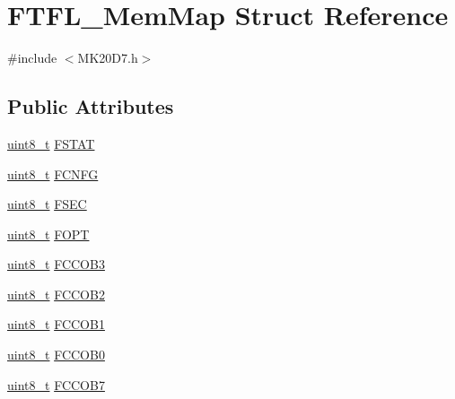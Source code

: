 \hypertarget{struct_f_t_f_l___mem_map}{}\section{F\+T\+F\+L\+\_\+\+Mem\+Map Struct Reference}
\label{struct_f_t_f_l___mem_map}


{\ttfamily \#include $<$M\+K20\+D7.\+h$>$}

\subsection*{Public Attributes}
\begin{DoxyCompactItemize}
\item 
\hyperlink{_p_e___types_8h_aba7bc1797add20fe3efdf37ced1182c5}{uint8\+\_\+t} \hyperlink{struct_f_t_f_l___mem_map_a7a42be6f802db97dadce683156238a24}{F\+S\+T\+AT}
\item 
\hyperlink{_p_e___types_8h_aba7bc1797add20fe3efdf37ced1182c5}{uint8\+\_\+t} \hyperlink{struct_f_t_f_l___mem_map_ae9a67c8547adc56fdcee67ba6e8bf50d}{F\+C\+N\+FG}
\item 
\hyperlink{_p_e___types_8h_aba7bc1797add20fe3efdf37ced1182c5}{uint8\+\_\+t} \hyperlink{struct_f_t_f_l___mem_map_a5fc856320bc3d50d05fdf534280c26ac}{F\+S\+EC}
\item 
\hyperlink{_p_e___types_8h_aba7bc1797add20fe3efdf37ced1182c5}{uint8\+\_\+t} \hyperlink{struct_f_t_f_l___mem_map_a2d17b69bebe89f8d8c18f983a8c68d84}{F\+O\+PT}
\item 
\hyperlink{_p_e___types_8h_aba7bc1797add20fe3efdf37ced1182c5}{uint8\+\_\+t} \hyperlink{struct_f_t_f_l___mem_map_ad8046f647e50794f4bee5f760113fabf}{F\+C\+C\+O\+B3}
\item 
\hyperlink{_p_e___types_8h_aba7bc1797add20fe3efdf37ced1182c5}{uint8\+\_\+t} \hyperlink{struct_f_t_f_l___mem_map_a556e1f48326b290f11167fcf7f1e470c}{F\+C\+C\+O\+B2}
\item 
\hyperlink{_p_e___types_8h_aba7bc1797add20fe3efdf37ced1182c5}{uint8\+\_\+t} \hyperlink{struct_f_t_f_l___mem_map_add93469709934b7ead4586253383596f}{F\+C\+C\+O\+B1}
\item 
\hyperlink{_p_e___types_8h_aba7bc1797add20fe3efdf37ced1182c5}{uint8\+\_\+t} \hyperlink{struct_f_t_f_l___mem_map_a350907588b2a9e58dd3524a92d01343d}{F\+C\+C\+O\+B0}
\item 
\hyperlink{_p_e___types_8h_aba7bc1797add20fe3efdf37ced1182c5}{uint8\+\_\+t} \hyperlink{struct_f_t_f_l___mem_map_a9bf5317162d58085b6dc94e071a57e32}{F\+C\+C\+O\+B7}

\end{DoxyCompactItemize}
